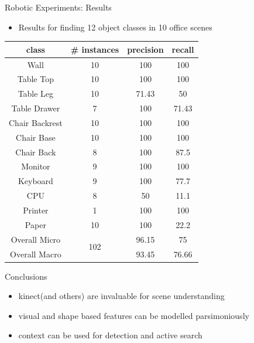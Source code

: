 \documentclass{beamer}
\begin{document}
\begin{frame}{Robotic Experiments: Results}

\begin{itemize}

\item Results for finding 12 object classes in 10 office scenes

\end{itemize}

\begin {center}
{\footnotesize 
\begin{tabular}{c | c | c | c}
class & \# instances & precision & recall \\
\hline
Wall & 10 & 100 & 100 \\
Table Top & 10 & 100  &100  \\
Table Leg & 10 & 71.43 & 50  \\
Table Drawer & 7 & 100 & 71.43 \\
Chair Backrest & 10 & 100 & 100  \\
Chair Base & 10 & 100  & 100 \\
Chair Back & 8 & 100 & 87.5 \\
Monitor & 9  & 100 & 100 \\
Keyboard & 9 & 100 & 77.7 \\
CPU & 8 & 50 & 11.1 \\ 
Printer & 1 & 100 & 100 \\
Paper & 10 & 100 & 22.2 \\
\hline
Overall Micro & \multirow{2}{*}{102} & 96.15 & 75 \\
Overall Macro & & 93.45 & 76.66 \\

\end{tabular}
}
\end{center}

\end{frame}

\begin{frame}{Conclusions}
\begin{itemize}
\item kinect(and others) are invaluable for scene understanding
\item visual and shape based features can be modelled parsimoniously
\item context can be used for detection and active search
\end{itemize}

\end{frame}
\end{document}
